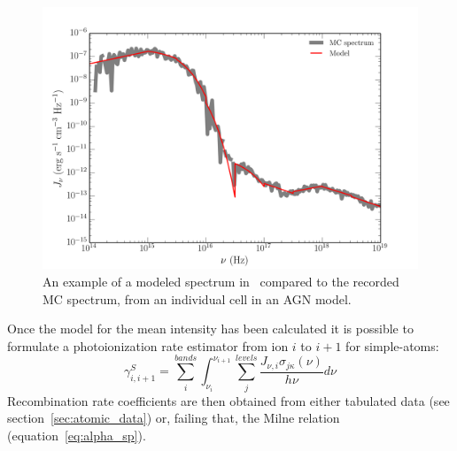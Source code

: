 \begin{figure}
\centering
\includegraphics[width=1.0\textwidth]{figures/03-radtrans/cell_spec.png}
\caption
{
An example of a modeled spectrum in \py\ compared to the recorded MC spectrum,
from an individual cell in an AGN model.
} 
\label{fig:cell_spec}
\end{figure}

Once the model for the mean intensity has been calculated it is possible
to formulate a photoionization rate estimator from ion $i$ to $i+1$ 
for simple-atoms:
\begin{equation}
\gamma_{i,i+1}^S = \sum_i^{bands} \int_{\nu_i}^{\nu_{i+1}} 
\sum_j^{levels} \frac{J_{\nu,i} \sigma_{j\kappa}(\nu) }{h \nu} d\nu
\end{equation}
Recombination rate coefficients are then obtained from 
either tabulated data (see section~\ref{sec:atomic_data})
or, failing that, the Milne relation (equation~\ref{eq:alpha_sp}).

